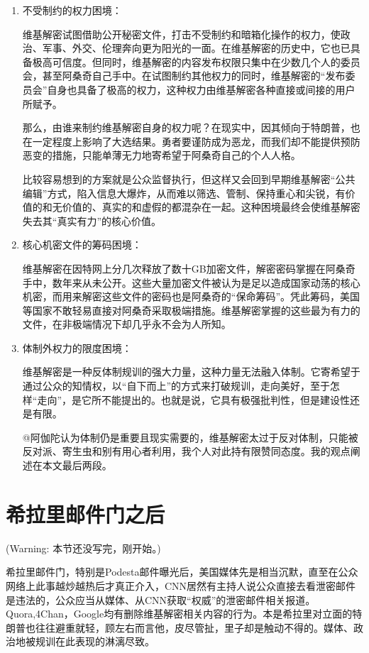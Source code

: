 \begin{enumerate}
\item 不受制约的权力困境：

  维基解密试图借助公开秘密文件，打击不受制约和暗箱化操作的权力，使政治、军事、外交、伦理奔向更为阳光的一面。在维基解密的历史中，它也已具备极高可信度。但同时，维基解密的内容发布权限只集中在少数几个人的委员会，甚至阿桑奇自己手中。在试图制约其他权力的同时，维基解密的“发布委员会”自身也具备了极高的权力，这种权力由维基解密各种直接或间接的用户所赋予。

  那么，由谁来制约维基解密自身的权力呢？在现实中，因其倾向于特朗普，也在一定程度上影响了大选结果。勇者要谨防成为恶龙，而我们却不能提供预防恶变的措施，只能单薄无力地寄希望于阿桑奇自己的个人人格。

  比较容易想到的方案就是公众监督执行，但这样又会回到早期维基解密“公共编辑”方式，陷入信息大爆炸，从而难以筛选、管制、保持重心和尖锐，有价值的和无价值的、真实的和虚假的都混杂在一起。这种困境最终会使维基解密失去其“真实有力”的核心价值。

\item 核心机密文件的筹码困境：

  维基解密在因特网上分几次释放了数十GB加密文件，解密密码掌握在阿桑奇手中，数年来从未公开。这些大量加密文件被认为是足以造成国家动荡的核心机密，而用来解密这些文件的密码也是阿桑奇的“保命筹码”。凭此筹码，美国等国家不敢轻易直接对阿桑奇采取极端措施。维基解密掌握的这些最为有力的文件，在非极端情况下却几乎永不会为人所知。

\item 体制外权力的限度困境：

  维基解密是一种反体制规训的强大力量，这种力量无法融入体制。它寄希望于通过公众的知情权，以“自下而上”的方式来打破规训，走向美好，至于怎样“走向”，是它所不能提出的。也就是说，它具有极强批判性，但是建设性还是有限。

  @阿伽陀认为体制仍是重要且现实需要的，维基解密太过于反对体制，只能被反对派、寄生虫和别有用心者利用，我个人对此持有限赞同态度。我的观点阐述在本文最后两段。
\end{enumerate}


\section{希拉里邮件门之后} (Warning: 本节还没写完，刚开始。)

希拉里邮件门，特别是Podesta邮件曝光后，美国媒体先是相当沉默，直至在公众网络上此事越炒越热后才真正介入，CNN居然有主持人说公众直接去看泄密邮件是违法的，公众应当从媒体、从CNN获取“权威”的泄密邮件相关报道。Quora,4Chan，Google均有删除维基解密相关内容的行为。本是希拉里对立面的特朗普也往往避重就轻，顾左右而言他，皮尽管扯，里子却是触动不得的。媒体、政治地被规训在此表现的淋漓尽致。

